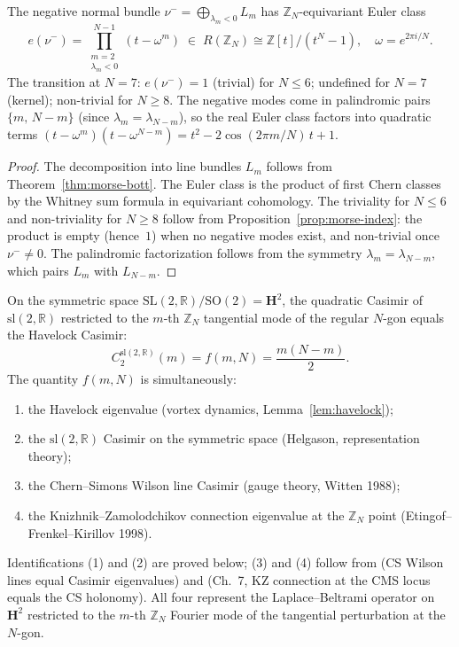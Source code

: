\begin{corollary}[Equivariant Euler class sign change at $N = 7$]
\label{cor:euler-class}
The negative normal bundle $\nu^- = \bigoplus_{\lambda_m < 0} L_m$
has $\mathbb{Z}_N$-equivariant Euler class
\[
  e(\nu^-) =
  \prod_{\substack{m = 2 \\ \lambda_m < 0}}^{N-1}
  (t - \omega^m)
  \;\in\; R(\mathbb{Z}_N) \cong \mathbb{Z}[t]/(t^N{-}1),
  \quad \omega = e^{2\pi i/N}.
\]
The transition at $N = 7$:
$e(\nu^-) = 1$ (trivial) for $N \le 6$;
undefined for $N = 7$ (kernel);
non-trivial for $N \ge 8$.
The negative modes come in palindromic pairs
$\{m,\, N{-}m\}$ (since $\lambda_m = \lambda_{N-m}$),
so the real Euler class factors into quadratic terms
$(t - \omega^m)(t - \omega^{N-m})
= t^2 - 2\cos(2\pi m/N)\,t + 1$.
\end{corollary}

\begin{proof}
The decomposition into line bundles $L_m$ follows from
Theorem~\ref{thm:morse-bott}.
The Euler class is the product of first Chern classes by the
Whitney sum formula in equivariant cohomology.
The triviality for $N \le 6$ and non-triviality for $N \ge 8$
follow from Proposition~\ref{prop:morse-index}: the product
is empty (hence~$1$) when no negative modes exist, and
non-trivial once $\nu^- \ne 0$.
The palindromic factorization follows from the symmetry
$\lambda_m = \lambda_{N-m}$, which pairs $L_m$ with $L_{N-m}$.
\end{proof}

\begin{theorem}
\label{thm:cs-havelock}
On the symmetric space $\mathrm{SL}(2,\mathbb{R})/\mathrm{SO}(2)
= \mathbf{H}^2$, the quadratic Casimir of
$\mathrm{sl}(2,\mathbb{R})$ restricted to the $m$-th
$\mathbb{Z}_N$ tangential mode of the regular $N$-gon equals
the Havelock Casimir:
\begin{equation}\label{eq:cs-havelock}
  C_2^{\mathrm{sl}(2,\mathbb{R})}(m)
  = f(m,N) = \frac{m(N{-}m)}{2}.
\end{equation}
The quantity $f(m,N)$ is simultaneously:
\begin{enumerate}
\item the Havelock eigenvalue (vortex dynamics,
  Lemma~\ref{lem:havelock});
\item the $\mathrm{sl}(2,\mathbb{R})$ Casimir on the
  symmetric space (Helgason, representation theory);
\item the Chern--Simons Wilson line Casimir
  (gauge theory, Witten 1988);
\item the Knizhnik--Zamolodchikov connection eigenvalue
  at the $\mathbb{Z}_N$ point
  (Etingof--Frenkel--Kirillov 1998).
\end{enumerate}
Identifications (1) and (2) are proved below; (3) and (4)
follow from \citealt{Witten1988} (CS Wilson lines equal
Casimir eigenvalues) and \citealt{EtingofFrenkelKirillov1998}
(Ch.~7, KZ connection at the CMS locus equals the CS
holonomy).  All four represent the Laplace--Beltrami operator
on $\mathbf{H}^2$ restricted to the $m$-th $\mathbb{Z}_N$
Fourier mode of the tangential perturbation at the $N$-gon.
\end{theorem}

